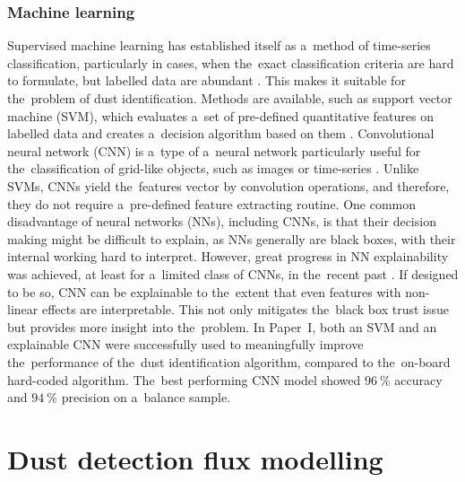 \subsubsection{Machine learning}

Supervised machine learning has established itself as a~method of time-series classification, particularly in cases, when the~exact classification criteria are hard to formulate, but labelled data are abundant \citep{wickstrom2022mixing}. This makes it suitable for the~problem of dust identification. Methods are available, such as support vector machine ({SVM}), which evaluates a~set of pre-defined quantitative features on labelled data and creates a~decision algorithm based on them \citep{vapnik1997support}. Convolutional neural network ({CNN}) is a~type of a~neural network particularly useful for the~classification of grid-like objects, such as images or time-series \citep{gu2018recent}. Unlike SVMs, CNNs yield the~features vector by convolution operations, and therefore, they do not require a~pre-defined feature extracting routine. One common disadvantage of neural networks ({NN}s), including CNNs, is that their decision making might be difficult to explain, as NNs generally are black boxes, with their internal working hard to interpret. However, great progress in NN explainability was achieved, at least for a~limited class of CNNs, in the~recent past \citep{samek2021explaining}. If designed to be so, CNN can be explainable to the~extent that even features with non-linear effects are interpretable. This not only mitigates the~black box trust issue but provides more insight into the~problem. In Paper~I, both an SVM and an explainable CNN were successfully used to meaningfully improve the~performance of the~dust identification algorithm, compared to the~on-board hard-coded algorithm. The~best performing CNN model showed $\SI{96}{\%}$ accuracy and $\SI{94}{\%}$ precision on a~balance sample.

\section{Dust detection flux modelling}

